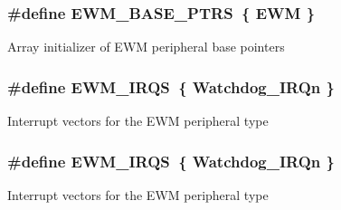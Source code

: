 \subsubsection[{\texorpdfstring{E\+W\+M\+\_\+\+B\+A\+S\+E\+\_\+\+P\+T\+RS}{EWM_BASE_PTRS}}]{\setlength{\rightskip}{0pt plus 5cm}\#define E\+W\+M\+\_\+\+B\+A\+S\+E\+\_\+\+P\+T\+RS~\{ {\bf E\+WM} \}}\hypertarget{group__EWM__Peripheral__Access__Layer_ga8b79ee9e363583bee6122ee3da7952b2}{}\label{group__EWM__Peripheral__Access__Layer_ga8b79ee9e363583bee6122ee3da7952b2}
Array initializer of E\+WM peripheral base pointers 
\subsubsection[{\texorpdfstring{E\+W\+M\+\_\+\+I\+R\+QS}{EWM_IRQS}}]{\setlength{\rightskip}{0pt plus 5cm}\#define E\+W\+M\+\_\+\+I\+R\+QS~\{ {\bf Watchdog\+\_\+\+I\+R\+Qn} \}}\hypertarget{group__EWM__Peripheral__Access__Layer_gac4f8bfcf7bfc6874ed0b321c67dd3111}{}\label{group__EWM__Peripheral__Access__Layer_gac4f8bfcf7bfc6874ed0b321c67dd3111}
Interrupt vectors for the E\+WM peripheral type 
\subsubsection[{\texorpdfstring{E\+W\+M\+\_\+\+I\+R\+QS}{EWM_IRQS}}]{\setlength{\rightskip}{0pt plus 5cm}\#define E\+W\+M\+\_\+\+I\+R\+QS~\{ {\bf Watchdog\+\_\+\+I\+R\+Qn} \}}\hypertarget{group__EWM__Peripheral__Access__Layer_gac4f8bfcf7bfc6874ed0b321c67dd3111}{}\label{group__EWM__Peripheral__Access__Layer_gac4f8bfcf7bfc6874ed0b321c67dd3111}
Interrupt vectors for the E\+WM peripheral type 
